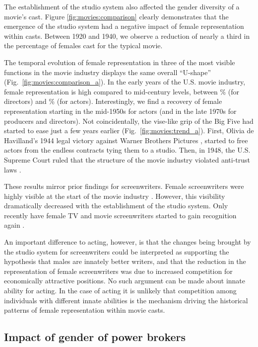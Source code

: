 The establishment of the studio system also affected the gender diversity of a movie's cast. Figure \ref{fig:movies:comparison} clearly demonstrates that the emergence of the studio system had a negative impact of female representation within casts. Between 1920 and 1940, we observe a reduction of nearly a third in the percentage of females cast for the typical movie.

The temporal evolution of female representation in three of the most visible functions in the movie industry displays the same overall ``U-shape'' (Fig.~\ref{fig:movies:comparison_a}). In the early years of the U.S. movie industry, female representation is high compared to mid-century levels, between \dirEarlyMean{}\% (for directors) and \actorEarlyMean{}\% (for actors). Interestingly, we find a recovery of female representation starting in the mid-1950s for actors (and in the late 1970s for producers and directors). Not coincidentally, the vise-like grip of the Big Five had started to ease just a few years earlier (Fig.~\ref{fig:movies:trend_a}). First, Olivia de Havilland's 1944 legal victory against Warner Brothers Pictures \cite{DeHaviland1944}, started to free actors from the endless contracts tying them to a studio. Then, in 1948, the U.S. Supreme Court ruled that the structure of the movie industry violated anti-trust laws \cite{US1948}.

These results mirror prior findings for screenwriters. Female screenwriters were highly visible at the start of the movie industry \cite{Smith-Doerr2010}. However, this visibility dramatically decreased with the establishment of the studio system. Only recently have female TV and movie screenwriters started to gain recognition again \cite{Bielby1996,Bielby2009}.

An important difference to acting, however, is that the changes being brought by the studio system for screenwriters could be interpreted as supporting the hypothesis that males are innately better writers, and that the reduction in the representation of female screenwriters was due to increased competition for economically attractive positions. No such argument can be made about innate ability for acting. In the case of acting it is unlikely that competition among individuals with different innate abilities is the mechanism driving the historical patterns of female representation within movie casts.


\subsection{Impact of gender of power brokers}

